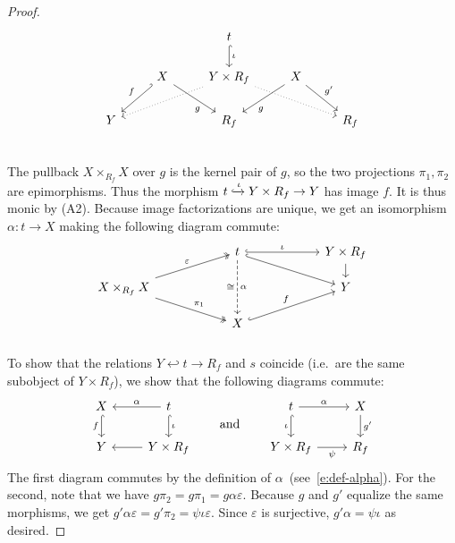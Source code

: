 \documentclass[11pt]{amsart}
\theoremstyle{definition}
\theoremstyle{remark}
\renewcommand\:\colon
\renewcommand\:\colon
\newcommand\eps{\varepsilon}
\begin{document}
\begin{proof}
\[\begin{tikzcd}
        && t \arrow[hook]{d}{\iota} && \\
        & X \arrow[swap,hook']{ld}{f} \arrow[swap,pos=.7]{rd}{g} & Y \times R_f \arrow[dotted]{lld}\arrow[dotted]{rrd} & X \arrow[pos=.7]{ld}{g} \arrow{rd}{g'} & \\
        Y && R_f && R_f \\
    \end{tikzcd}
    \]
    The pullback $X \times_{R_f} X$ over $g$ is the kernel pair of $g$, so
    the two projections $\pi_1, \pi_2$ are epimorphisms. Thus the morphism $t \xhookrightarrow{\iota} Y \times R_f \to Y$ has image $f$. It is thus monic by (A2). Because image factorizations are unique, we get an
    isomorphism $\alpha: t \to X$ making the following diagram commute:
    \begin{equation} \label{e:def-alpha} \begin{tikzcd}[column sep=2cm,row sep=.4cm]
        & t \arrow[hook,start anchor={[yshift=-1pt]}]{rd} \arrow[dashed]{dd}{\alpha}[swap]{\cong} \arrow[hook]{r}{\iota} & Y \times R_f \arrow{d} \\
        X \times_{R_f} X \arrow[two heads]{ru}{\eps} \arrow[two heads]{rd}{\pi_1} && Y \\
        & X \arrow[hook]{ru}{f} & \\
    \end{tikzcd}\end{equation}
    To show that the relations $Y \hookleftarrow t \to R_f$ and $s$
    coincide (i.e.~are the same subobject of $Y \times R_f$), we show that the following diagrams commute:
    \[\begin{tikzcd}
        X \arrow[hook,swap]{d}{f} & t \arrow[swap]{l}{\alpha} \arrow[hook]{d}{\iota} \\
        Y & Y \times R_f \arrow{l}
    \end{tikzcd} \qquad\text{and}\qquad
    \begin{tikzcd}
        t \arrow[hook,swap]{d}{\iota} \arrow{r}{\alpha} & X \arrow{d}{g'} \\
        Y \times R_f \arrow[swap]{r}{\psi} & R_f
    \end{tikzcd}\]
    The first diagram commutes by the definition of
    $\alpha$~(see~\eqref{e:def-alpha}). For the second, note that we have
    $g\pi_2 = g\pi_1 =g\alpha\eps$. Because $g$ and $g'$ equalize the same morphisms, we get $g'\alpha\eps = g'\pi_2 = \psi\iota\eps$. Since
    $\eps$ is surjective, $g'\alpha = \psi\iota$ as desired.
\end{proof}
\end{document}
